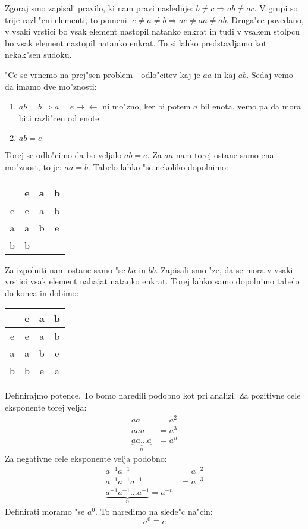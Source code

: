 Zgoraj smo zapisali pravilo, ki nam pravi naslednje: $b \neq c \Rightarrow ab \neq ac$. V grupi so trije razli"cni elementi, to pomeni: $e \neq a \neq b \Rightarrow ae \neq aa \neq ab$. Druga"ce povedano, v vsaki vrstici bo vsak element nastopil natanko enkrat in tudi v vsakem stolpcu bo vsak element nastopil natanko enkrat. To si lahko predstavljamo kot nekak"sen sudoku.

"Ce se vrnemo na prej"sen problem - odlo"citev kaj je $aa$ in kaj $ab$. Sedaj vemo da imamo dve mo"znosti:
\begin{enumerate}[1)]
	\item $ab = b \Rightarrow a = e \rightarrow\leftarrow$ ni mo"zno, ker bi potem $a$ bil enota, vemo pa da mora biti razli"cen od enote.
	\item $ab = e$
\end{enumerate}
Torej se odlo"cimo da bo veljalo $ab = e$. Za $aa$ nam torej ostane samo ena mo"znost, to je: $aa = b$. Tabelo lahko "se nekoliko dopolnimo:
\begin{table}[!htbp]
	\centering
	\begin{tabular}{c|ccc}
		& e & a & b \\ \hline
		e & e & a & b\\
		a & a & b & e \\
		b & b &  & 
	\end{tabular}
\end{table}

Za izpolniti nam ostane samo "se $ba$ in $bb$. Zapisali smo "ze, da se mora v vsaki vrstici vsak element nahajat natanko enkrat. Torej lahko samo dopolnimo tabelo do konca in dobimo:
\begin{table}[!htbp]
	\centering
	\begin{tabular}{c|ccc}
		& e & a & b \\ \hline
		e & e & a & b\\
		a & a & b & e \\
		b & b & e & a
	\end{tabular}
\end{table}

Definirajmo potence. To bomo naredili podobno kot pri analizi. Za pozitivne cele eksponente torej velja:
\begin{align*}
aa &= a^2 \\
aaa &= a^3 \\
\underbrace{aa\ldots a}_{n} &= a^n
\end{align*}
Za negativne cele eksponente velja podobno:
\begin{align*}
a^{-1}a^{-1} &= a^{-2} \\
a^{-1}a^{-1}a^{-1} &= a^{-3} \\
\underbrace{a^{-1}a^{-1}\ldots a^{-1}}_{n} = a^{-n}
\end{align*}
Definirati moramo "se $a^0$. To naredimo na slede"c na"cin:
\begin{equation*}
a^0 \equiv e
\end{equation*}

